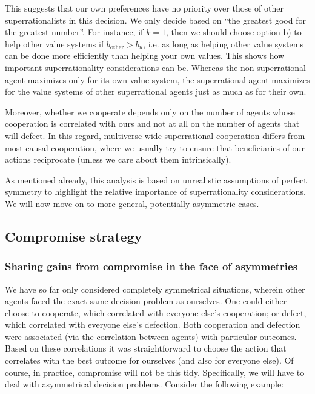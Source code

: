 This suggests that our own preferences have no priority over those of
other superrationalists in this decision. We only decide based on ``the
greatest good for the greatest number''. For instance, if \(k = 1\),
then we should choose option b) to help other value systems if
\(b_{\text{other}} > b_{u}\), i.e. as long as helping other value
systems can be done more efficiently than helping your own values. This
shows how important superrationality considerations can be. Whereas the
non-superrational agent maximizes only for its own value system, the
superrational agent maximizes for the value systems of other
superrational agents just as much as for their own.

Moreover, whether we cooperate depends only on the number of agents
whose cooperation is correlated with ours and not at all on the number
of agents that will defect. In this regard, multiverse-wide
superrational cooperation differs from most causal cooperation, where we
usually try to ensure that beneficiaries of our actions reciprocate
(unless we care about them intrinsically).

As mentioned already, this analysis is based on unrealistic assumptions
of perfect symmetry to highlight the relative importance of
superrationality considerations. We will now move on to more general,
potentially asymmetric cases.

\hypertarget{compromise-strategy}{\subsection{Compromise
strategy}\label{compromise-strategy}}

\subsubsection{Sharing gains from compromise in the face of
asymmetries}\label{sharing-gains-from-compromise-in-the-face-of-asymmetries}

We have so far only considered completely symmetrical situations,
wherein other agents faced the exact same decision problem as ourselves.
One could either choose to cooperate, which correlated with everyone
else's cooperation; or defect, which correlated with everyone else's
defection. Both cooperation and defection were associated (via the
correlation between agents) with particular outcomes. Based on these
correlations it was straightforward to choose the action that correlates
with the best outcome for ourselves (and also for everyone else). Of
course, in practice, compromise will not be this tidy. Specifically, we
will have to deal with asymmetrical decision problems. Consider the
following example:

